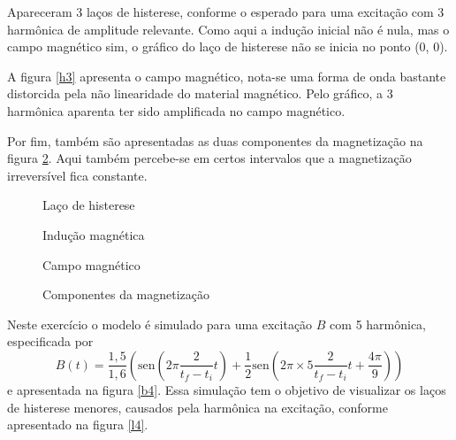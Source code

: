 \documentclass{homeworg}
\begin{document}
\hspace{1cm} Apareceram 3 laços de histerese, conforme o esperado para uma excitação com {3\textordfeminine} harmônica de amplitude relevante. Como aqui a indução inicial não é nula, mas o campo magnético sim, o gráfico do laço de histerese não se inicia no ponto (0, 0).

\hspace{1cm} A figura \ref{h3} apresenta o campo magnético, nota-se uma forma de onda bastante distorcida pela não linearidade do material magnético. Pelo gráfico, a {3\textordfeminine} harmônica aparenta ter sido amplificada no campo magnético.

\hspace{1cm} Por fim, também são apresentadas as duas componentes da magnetização na figura \ref{c3}. Aqui também percebe-se em certos intervalos que a magnetização irreversível fica constante.

\begin{figure}[!h]
  \begin{minipage}{.49\linewidth}
    \centering
    
    \vspace{-.5cm}
    \caption{Laço de histerese}
    \label{b3}
  \end{minipage}
  \begin{minipage}{.49\linewidth}
    \centering
    
    \vspace{-.5cm}
    \caption{Indução magnética}
    \label{l3}
  \end{minipage}
\end{figure}
\begin{figure}[!h]
  \begin{minipage}{.49\linewidth}
    \centering
    
    \vspace{-.5cm}
    \caption{Campo magnético}
    \label{h3}
  \end{minipage}%
  \begin{minipage}{.49\linewidth}
    \centering
    
    \vspace{-.5cm}
    \caption{Componentes da magnetização}
    \label{c3}
  \end{minipage}%
\end{figure}

\exercise

\hspace{1cm} Neste exercício o modelo é simulado para uma excitação $B$ com {5\textordfeminine} harmônica, especificada por
\begin{equation}
  B(t) = \frac{1,5}{1,6} \left(\mathrm{sen}\left(2\pi \frac{2}{t_f-t_i} t\right) + \frac{1}{2} \mathrm{sen}\left(2\pi\times 5 \frac{2}{t_f-t_i} t + \frac{4\pi}{9}\right)\right)
\end{equation}
e apresentada na figura \ref{b4}. Essa simulação tem o objetivo de visualizar os laços de histerese menores, causados pela harmônica na excitação, conforme apresentado na figura \ref{l4}.
\end{document}
